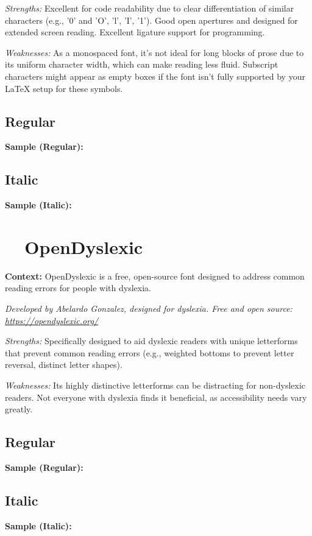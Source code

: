 \begin{raggedright}
	\emph{Strengths:} Excellent for code readability due to clear differentiation of similar characters (e.g., '0' and 'O', 'l', 'I', '1'). Good open apertures and designed for extended screen reading. Excellent ligature support for programming.

	\emph{Weaknesses:} As a monospaced font, it's not ideal for long blocks of prose due to its uniform character width, which can make reading less fluid. Subscript characters might appear as empty boxes if the font isn't fully supported by your LaTeX setup for these symbols.

	\subsection{Regular}
	\noindent\textbf{Sample (Regular):}
	\FontSample{\jetbrainsmonofont}

	\subsection{Italic}
	\noindent\textbf{Sample (Italic):}
	\FontSample{{\jetbrainsmonofont\itshape}}
\end{raggedright}




\pagebreak
\section{~~OpenDyslexic}\label{app5:sec:opendyslexic}
\noindent
\textbf{Context:} OpenDyslexic is a free, open-source font designed to address common reading errors for people with dyslexia.

\emph{Developed by Abelardo Gonzalez, designed for dyslexia. Free and open source: \url{https://opendyslexic.org/}}
\begin{raggedright}
	\emph{Strengths:} Specifically designed to aid dyslexic readers with unique letterforms that prevent common reading errors (e.g., weighted bottoms to prevent letter reversal, distinct letter shapes).

	\emph{Weaknesses:} Its highly distinctive letterforms can be distracting for non-dyslexic readers. Not everyone with dyslexia finds it beneficial, as accessibility needs vary greatly.

	\subsection{Regular}
	\noindent\textbf{Sample (Regular):}
	\FontSample{\opendyslexicfont}

	\subsection{Italic}
	\noindent\textbf{Sample (Italic):}
	\FontSample{{\opendyslexicfont\itshape}}
\end{raggedright}


